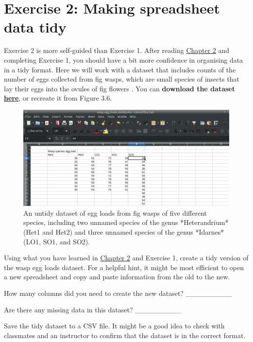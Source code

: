 \documentclass[
]{scrbook}
\begin{document}
\hypertarget{exercise-2-making-spreadsheet-data-tidy}{%
\section{Exercise 2: Making spreadsheet data tidy}\label{exercise-2-making-spreadsheet-data-tidy}}

Exercise 2 is more self-guided than Exercise 1.
After reading \protect\hyperlink{Chapter_2}{Chapter 2} and completing Exercise 1, you should have a bit more confidence in organising data in a tidy format.
Here we will work with a dataset that includes counts of the number of eggs collected from fig wasps, which are small species of insects that lay their eggs into the ovules of fig flowers \citep{Weiblen2002}.
You can \textbf{download the dataset \href{https://github.com/bradduthie/SCIU4T4/blob/main/data/wasp_egg_loads_untidy.xlsx?raw=true}{here}}, or recreate it from Figure 3.6.

\begin{figure}
\includegraphics[width=1\linewidth]{img/wasp_egg_loads_untidy} \caption{An untidy dataset of egg loads from fig wasps of five different species, including two unnamed species of the genus *Heterandrium* (Het1 and Het2) and three unnamed species of the genus *Idarnes* (LO1, SO1, and SO2).}\label{fig:unnamed-chunk-16}
\end{figure}

Using what you have learned in \protect\hyperlink{Chapter_2}{Chapter 2} and Exercise 1, create a tidy version of the wasp egg loads dataset.
For a helpful hint, it might be most efficient to open a new spreadsheet and copy and paste information from the old to the new.

How many columns did you need to create the new dataset? \_\_\_\_\_\_\_\_\_

Are there any missing data in this dataset? \_\_\_\_\_\_\_\_\_

Save the tidy dataset to a CSV file.
It might be a good idea to check with classmates and an instructor to confirm that the dataset is in the correct format.
\end{document}
